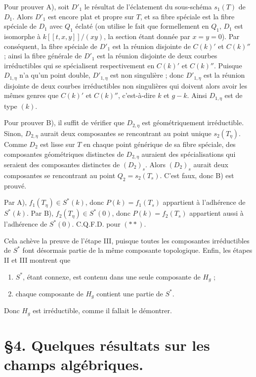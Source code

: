 \documentclass[10pt]{article}
\begin{document}
Pour prouver A), soit $D'_1$ le résultat de l'éclatement du sous-schéma $s_1(T)$ de $D_1$. Alors $D'_1$ est encore plat et propre sur $T$, et sa fibre spéciale est la fibre spéciale de $D_1$ avec $Q_1$ éclaté (on utilise le fait que formellement en $Q_1$, $D_1$ est isomorphe à $k[[t,x,y]]/(xy)$, la section étant donnée par $x=y=0$). Par conséquent, la fibre spéciale de $D'_1$ est la réunion disjointe de $C(k)'$ et $C(k)''$ ; ainsi la fibre générale de $D'_1$ est la réunion disjointe de deux courbes irréductibles qui se spécialisent respectivement en $C(k)'$ et $C(k)''$. Puisque $D_{1,\eta}$ n'a qu'un point double, $D'_{1,\eta}$ est non singulière ; donc $D'_{1,\eta}$ est la réunion disjointe de deux courbes irréductibles non singulières qui doivent alors avoir les mêmes genres que $C(k)'$ et $C(k)''$, c'est-à-dire $k$ et $g-k$. Ainsi $D_{1,\eta}$ est de type $(k)$.

Pour prouver B), il suffit de vérifier que $D_{2,\eta}$ est géométriquement irréductible. Sinon, $D_{2,\eta}$ aurait deux composantes se rencontrant au point unique $s_2(T_\eta)$. Comme $D_2$ est lisse sur $T$ en chaque point générique de sa fibre spéciale, des composantes géométriques distinctes de $D_{2,\eta}$ auraient des spécialisations qui seraient des composantes distinctes de $(D_2)_s$. Alors $(D_2)_s$ aurait deux composantes se rencontrant au point $Q_2=s_2(T_s)$. C'est faux, donc B) est prouvé.

Par A), $f_1(T_\eta)\in S^*(k)$, donc $P(k)=f_1(T_s)$ appartient à l'adhérence de $S^*(k)$. Par B), $f_2(T_\eta)\in S^*(0)$, donc $P(k)=f_2(T_s)$ appartient aussi à l'adhérence de $S^*(0)$. C.Q.F.D. pour $(**)$.

Cela achève la preuve de l'étape III, puisque toutes les composantes irréductibles de $S^*$ font désormais partie de la même composante topologique. Enfin, les étapes II et III montrent que
\begin{enumerate}[label=\emph{\alph*)}]
\item $S^*$, étant connexe, est contenu dans une seule composante de $H_g$ ;
\item chaque composante de $H_g$ contient une partie de $S^*$.
\end{enumerate}
Donc $H_g$ est irréductible, comme il fallait le démontrer.

\section*{\S 4. Quelques résultats sur les champs algébriques.}
\end{document}

